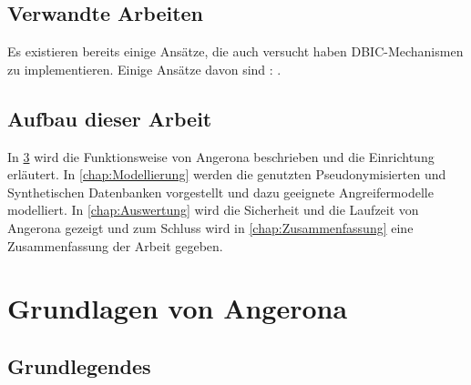 \documentclass[german,version-2020-11]{uzl-thesis}
\begin{document}
\section{Verwandte Arbeiten}
Es existieren bereits einige Ansätze, die auch versucht haben DBIC-Mechanismen zu implementieren. Einige Ansätze davon sind : . 


\section{Aufbau dieser Arbeit}
In \cref{chap:Grundlagen} wird die Funktionsweise von Angerona beschrieben und die Einrichtung erläutert. In \cref{chap:Modellierung} werden die genutzten Pseudonymisierten und Synthetischen Datenbanken vorgestellt und dazu geeignete Angreifermodelle modelliert. In \cref{chap:Auswertung} wird die Sicherheit und die Laufzeit von Angerona gezeigt und zum Schluss wird in \cref{chap:Zusammenfassung} eine Zusammenfassung der Arbeit gegeben.
\chapter{Grundlagen von Angerona}\label{chap:Grundlagen}
\section{Grundlegendes}
\end{document}
